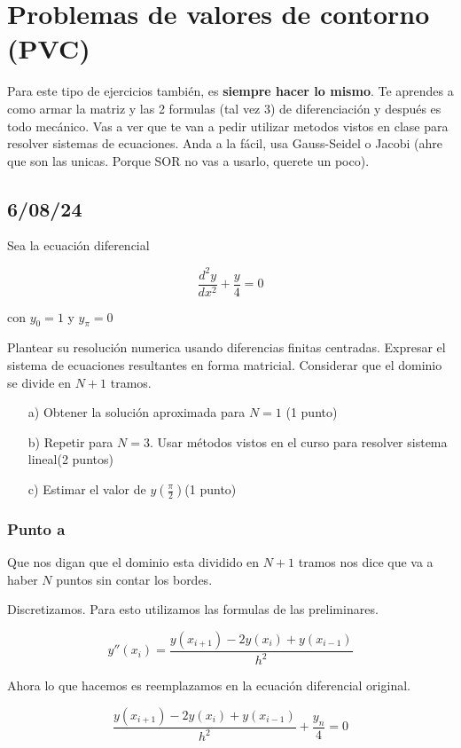 \section{Problemas de valores de contorno (PVC)}
Para este tipo de ejercicios también, es \textbf{siempre hacer lo mismo}. Te aprendes a como armar la matriz y las 2 formulas (tal vez 3) de diferenciación y después es todo mecánico. Vas a ver que te van a pedir utilizar metodos vistos en clase para resolver sistemas de ecuaciones. Anda a la fácil, usa Gauss-Seidel o Jacobi (ahre que son las unicas. Porque SOR no vas a usarlo, querete un poco).


\subsection{6/08/24}

Sea la ecuación diferencial

$$\frac{d^2y}{dx^2} + \frac{y}{4} = 0$$

con $y_0 = 1$ y $y_\pi = 0$

Plantear su resolución numerica usando diferencias finitas centradas. Expresar el sistema de ecuaciones resultantes en forma matricial. Considerar que el dominio se divide en $N + 1$ tramos.

\begin{enumerate}
    \item[a)] Obtener la solución aproximada para $N = 1$ (1 punto)
    \item[b)] Repetir para $N = 3$. Usar métodos vistos en el curso para resolver sistema lineal(2 puntos)
    \item[c)]Estimar el valor de $y(\frac{\pi}{2})$(1 punto)
\end{enumerate}

\subsubsection{Punto a}

Que nos digan que el dominio esta dividido en $N + 1$ tramos nos dice que va a haber $N$ puntos sin contar los bordes.


Discretizamos. Para esto utilizamos las formulas de las preliminares. 


$$
y''(x_i) = \frac{y(x_{i+1}) - 2y(x_i) + y(x_{i-1}) }{h^2}
$$

Ahora lo que hacemos es reemplazamos en la ecuación diferencial original. 



$$
\frac{y(x_{i+1}) - 2y(x_i) + y(x_{i-1}) }{h^2} + \frac{y_n}{4} = 0
$$


